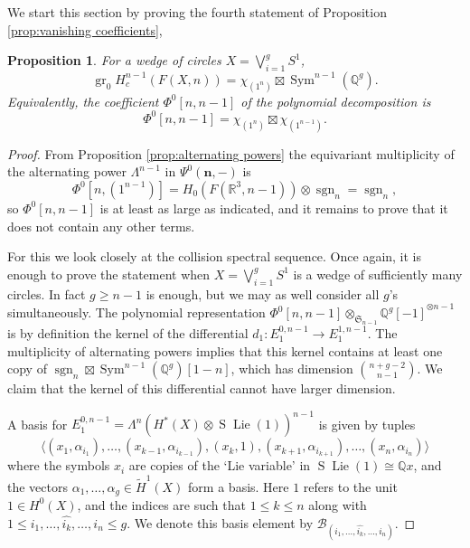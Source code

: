 \documentclass[12pt]{article}
\newcommand{\Q}{\mathbb{Q}}
\newcommand{\R}{\mathbb{R}}
\newcommand{\SymGroup}[1][n]{\mathfrak{S}_{#1}}
\newcommand{\Specht}[1]{\chi_{#1}}
\newcommand{\n}[1][n]{\mathbf{#1}}
\newcommand{\sgn}[1][n]{\operatorname{sgn}_{#1}}
\DeclareMathOperator{\gr}{gr}
\DeclareMathOperator{\Lie}{Lie}
\DeclareMathOperator{\Suspension}{S}
\DeclareMathOperator{\Sym}{Sym}
\theoremstyle{plain}
\newtheorem{prop}[thm]{Proposition}
\theoremstyle{definition}
\theoremstyle{remark}
\begin{document}
We start this section by proving the fourth statement of Proposition \ref{prop:vanishing coefficients},
\begin{prop}
    For a wedge of circles $X = \bigvee_{i=1}^g S^1$,
    \[
        \gr_0 H_c^{n-1}(F(X, n)) = \Specht{(1^n)}\boxtimes \Sym^{n-1}(\Q^g).
    \]
    Equivalently, the coefficient $\Phi^0[n,n-1]$ of the polynomial decomposition is
    \[
        \Phi^0[n, n-1] = \Specht{(1^n)}\boxtimes \Specht{{(1^{n-1})}}.
    \]
\end{prop}

\begin{proof}
    From Proposition \ref{prop:alternating powers} the equivariant multiplicity of the alternating power $\Lambda^{n-1}$ in $\Psi^0(\n, -)$ is 
    \[
        \Phi^0[n, {(1^{n-1})}] = H_0(F(\R^3, n-1))\otimes \sgn[n] = \sgn[n],
    \]
    so $\Phi^0[n, n-1]$ is at least as large as indicated, and it remains to prove that it does not contain any other terms.
    
    For this we look closely at the collision spectral sequence. Once again, it is enough to prove the statement when $X = \bigvee_{i=1}^g{S^1}$ is a wedge of sufficiently many circles. In fact $g\geq n-1$ is enough, but we may as well consider all $g$'s simultaneously. The polynomial representation $\Phi^0[n, n-1]\otimes_{\SymGroup[n-1]}{\Q^g[-1]}^{\otimes n-1}$ is by definition the kernel of the differential $d_1\colon E_1^{0,n-1}\to E_1^{1,n-1}$. The multiplicity of alternating powers implies that this kernel contains at least one copy of $\sgn[n]\boxtimes \Sym^{n-1}(\Q^g)[1-n]$, which has dimension $\binom{n+g-2}{n-1}$. We claim that the kernel of this differential cannot have larger dimension.
    
    A basis for $E_1^{0,n-1} = \Lambda^{n}\left(H^*(X)\otimes \Suspension\Lie(1)\right)^{n-1}$ is given by tuples
    \begin{equation*}
        \langle(x_1, \alpha_{i_1}), \ldots, (x_{k-1}, \alpha_{i_{k-1}}), (x_k, 1), (x_{k+1}, \alpha_{i_{k+1}}), \ldots, (x_n, \alpha_{i_{n}})\rangle
    \end{equation*}
    where the symbols $x_i$ are copies of the `Lie variable' in $\Suspension\Lie(1)\cong \Q x$, and the vectors $\alpha_1,\ldots,\alpha_g \in \tilde{H}^1(X)$ form a basis. Here $1$ refers to the unit $1\in H^0(X)$, and the indices are such that $1\leq k \leq n$ along with $1\leq i_1,\ldots, \widehat{i_k},\ldots, i_{n} \leq g$. We denote this basis element by $\mathcal{B}_{(i_1,\ldots, \widehat{i_k},\ldots, i_{n})}$.
    

\end{proof}
\end{document}
